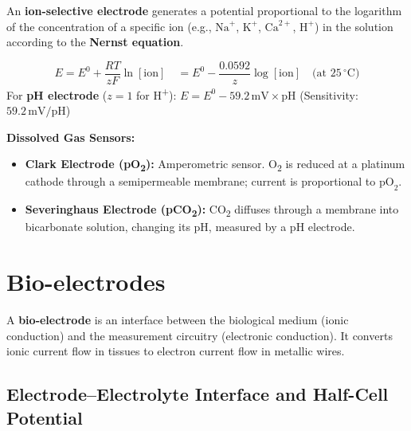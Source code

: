\documentclass[12pt,a4paper]{article}
\begin{document}
\begin{tcolorbox}[defbox, title={\textbf{Ion-Selective Electrode (ISE)}}]
An \textbf{ion-selective electrode} generates a potential proportional to the logarithm of the concentration of a specific ion (e.g., $\text{Na}^+$, $\text{K}^+$, $\text{Ca}^{2+}$, $\text{H}^+$) in the solution according to the \textbf{Nernst equation}.
\end{tcolorbox}

\begin{tcolorbox}[formulabox, title={\textbf{Nernst Equation and pH Electrode}}]
\[
E = E^0 + \frac{RT}{zF}\ln[\text{ion}] \quad = E^0 - \frac{0.0592}{z}\log[\text{ion}] \quad \text{(at } 25\,^{\circ}\text{C)}
\]
For \textbf{pH electrode} ($z=1$ for H\textsuperscript{+}): $E = E^0 - 59.2\,\text{mV} \times \text{pH}$ \quad (Sensitivity: $59.2\,\text{mV/pH}$)
\end{tcolorbox}

\textbf{Dissolved Gas Sensors:}
\begin{itemize}[leftmargin=*, itemsep=3pt]
  \item \textbf{Clark Electrode (pO\textsubscript{2}):} Amperometric sensor. O\textsubscript{2} is reduced at a platinum cathode through a semipermeable membrane; current is proportional to $\text{pO}_2$.
  \item \textbf{Severinghaus Electrode (pCO\textsubscript{2}):} CO\textsubscript{2} diffuses through a membrane into bicarbonate solution, changing its pH, measured by a pH electrode.
\end{itemize}

\section{Bio-electrodes}

\begin{tcolorbox}[defbox, title={\textbf{Bio-electrode}}]
A \textbf{bio-electrode} is an interface between the biological medium (ionic conduction) and the measurement circuitry (electronic conduction). It converts ionic current flow in tissues to electron current flow in metallic wires.
\end{tcolorbox}

\subsection{Electrode--Electrolyte Interface and Half-Cell Potential}
\end{document}
